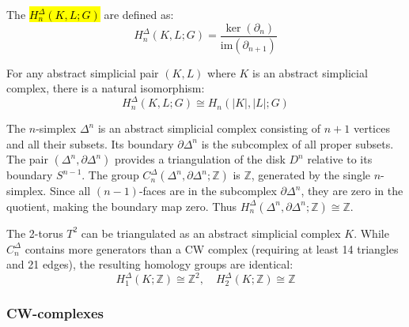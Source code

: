 \begin{definition} 
The  \hl{$H_n^{\Delta}(K, L; G)$} are defined as:
$$H_n^{\Delta}(K, L; G) = \frac{\ker(\partial_n)}{\text{im}(\partial_{n+1})}$$
\end{definition}

\begin{theorem} 
For any abstract simplicial pair $(K, L)$ where $K$ is an abstract simplicial complex, there is a natural isomorphism:
$$H_n^{\Delta}(K, L; G) \cong H_n(|K|, |L|; G)$$
\end{theorem}

\begin{example}
The $n$-simplex $\Delta^n$ is an abstract simplicial complex consisting of $n+1$ vertices and all their subsets. Its boundary $\partial \Delta^n$ is the subcomplex of all proper subsets. The pair $(\Delta^n, \partial \Delta^n)$ provides a triangulation of the disk $D^n$ relative to its boundary $S^{n-1}$. The group $C_n^{\Delta}(\Delta^n, \partial \Delta^n; \mathbb{Z})$ is $\mathbb{Z}$, generated by the single $n$-simplex. Since all $(n-1)$-faces are in the subcomplex $\partial \Delta^n$, they are zero in the quotient, making the boundary map zero. Thus $H_n^{\Delta}(\Delta^n, \partial \Delta^n; \mathbb{Z}) \cong \mathbb{Z}$.
\end{example}

\begin{example}
The 2-torus $T^2$ can be triangulated as an abstract simplicial complex $K$. While $C_n^{\Delta}$ contains more generators than a CW complex (requiring at least 14 triangles and 21 edges), the resulting homology groups are identical:
$$H_1^{\Delta}(K; \mathbb{Z}) \cong \mathbb{Z}^2, \quad H_2^{\Delta}(K; \mathbb{Z}) \cong \mathbb{Z}$$
\end{example}


\subsubsection{CW-complexes}











